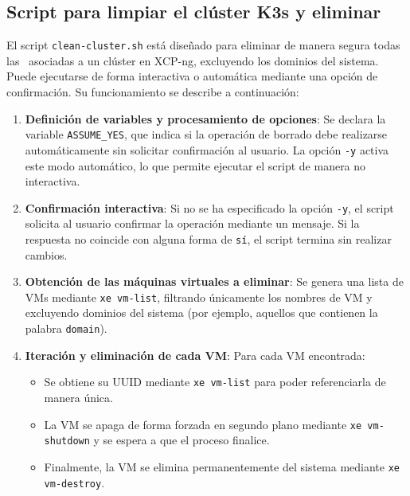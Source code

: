 \subsection{Script para limpiar el clúster K3s y eliminar \VM}
\noindent
El script \texttt{clean-cluster.sh} está diseñado para eliminar de manera segura todas las \VM\ asociadas a un clúster en XCP-ng, excluyendo los dominios del sistema. Puede ejecutarse de forma interactiva o automática mediante una opción de confirmación. Su funcionamiento se describe a continuación:

\begin{enumerate}
    \item \textbf{Definición de variables y procesamiento de opciones}:  
    Se declara la variable \texttt{ASSUME\_YES}, que indica si la operación de borrado debe realizarse automáticamente sin solicitar confirmación al usuario.  
    La opción \texttt{-y} activa este modo automático, lo que permite ejecutar el script de manera no interactiva.

    \item \textbf{Confirmación interactiva}:  
    Si no se ha especificado la opción \texttt{-y}, el script solicita al usuario confirmar la operación mediante un mensaje. Si la respuesta no coincide con alguna forma de \texttt{sí}, el script termina sin realizar cambios.

    \item \textbf{Obtención de las máquinas virtuales a eliminar}:  
    Se genera una lista de VMs mediante \texttt{xe vm-list}, filtrando únicamente los nombres de VM y excluyendo dominios del sistema (por ejemplo, aquellos que contienen la palabra \texttt{domain}).  

    \item \textbf{Iteración y eliminación de cada VM}:  
    Para cada VM encontrada:
    \begin{itemize}
        \item Se obtiene su UUID mediante \texttt{xe vm-list} para poder referenciarla de manera única.
        \item La VM se apaga de forma forzada en segundo plano mediante \texttt{xe vm-shutdown} y se espera a que el proceso finalice.
        \item Finalmente, la VM se elimina permanentemente del sistema mediante \texttt{xe vm-destroy}.
    \end{itemize}
\end{enumerate}


